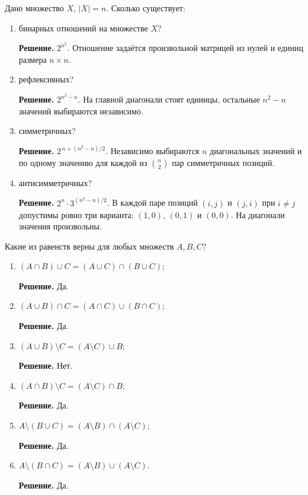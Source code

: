 \begin{problems}
\item Дано множество $X$, $|X|=n$. Сколько существует:
\begin{enumerate}[label=\cyralph*)]
\item бинарных отношений на множестве $X$?
\par\smallskip\noindent\textbf{Решение.} $2^{n^2}$. Отношение задаётся произвольной матрицей из нулей и единиц размера $n\times n$.\par
\item рефлексивных?
\par\smallskip\noindent\textbf{Решение.} $2^{n^2-n}$. На главной диагонали стоят единицы, остальные $n^2-n$ значений выбираются независимо.\par
\item симметричных?
\par\smallskip\noindent\textbf{Решение.} $2^{\,n+(n^2-n)/2}$. Независимо выбираются $n$ диагональных значений и по одному значению для каждой из $\binom n2$ пар симметричных позиций.\par
\item антисимметричных?
\par\smallskip\noindent\textbf{Решение.} $2^n\cdot3^{(n^2-n)/2}$. В каждой паре позиций $(i,j)$ и $(j,i)$ при $i\ne j$ допустимы ровно три варианта: $(1,0)$, $(0,1)$ и $(0,0)$. На диагонали значения произвольны.\par
\end{enumerate}

\item Какие из равенств верны для любых множеств $A,B,C$?
\begin{enumerate}[label=\cyralph*)]
  \item $(A\cap B)\cup C=(A\cup C)\cap(B\cup C)$;
  \par\smallskip\noindent\textbf{Решение.} Да.\par
  \item $(A\cup B)\cap C=(A\cap C)\cup(B\cap C)$;
  \par\smallskip\noindent\textbf{Решение.} Да.\par
  \item $(A\cup B)\setminus C=(A\setminus C)\cup B$;
  \par\smallskip\noindent\textbf{Решение.} Нет.\par
  \item $(A\cap B)\setminus C=(A\setminus C)\cap B$;
  \par\smallskip\noindent\textbf{Решение.} Да.\par
  \item $A\setminus(B\cup C)=(A\setminus B)\cap(A\setminus C)$;
  \par\smallskip\noindent\textbf{Решение.} Да.\par
  \item $A\setminus(B\cap C)=(A\setminus B)\cup(A\setminus C)$.
  \par\smallskip\noindent\textbf{Решение.} Да.\par
\end{enumerate}


\end{problems}
